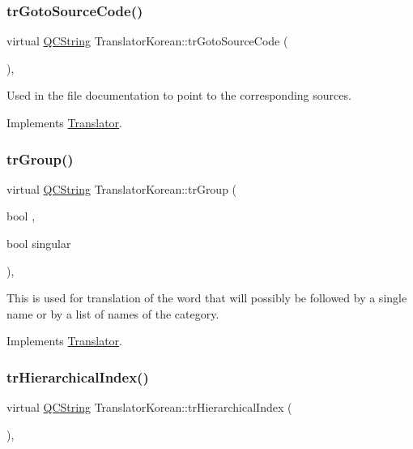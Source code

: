\subsubsection{\texorpdfstring{trGotoSourceCode()}{trGotoSourceCode()}}
{\footnotesize\ttfamily virtual \mbox{\hyperlink{class_q_c_string}{Q\+C\+String}} Translator\+Korean\+::tr\+Goto\+Source\+Code (\begin{DoxyParamCaption}{ }\end{DoxyParamCaption})\hspace{0.3cm}{\ttfamily [inline]}, {\ttfamily [virtual]}}

Used in the file documentation to point to the corresponding sources. 

Implements \mbox{\hyperlink{class_translator}{Translator}}.

\mbox{\label{class_translator_korean_abb8abbd3d17b2c6b9052eb9dc1ba31f0}} 
\subsubsection{\texorpdfstring{trGroup()}{trGroup()}}
{\footnotesize\ttfamily virtual \mbox{\hyperlink{class_q_c_string}{Q\+C\+String}} Translator\+Korean\+::tr\+Group (\begin{DoxyParamCaption}\item[{bool}]{,  }\item[{bool}]{singular }\end{DoxyParamCaption})\hspace{0.3cm}{\ttfamily [inline]}, {\ttfamily [virtual]}}

This is used for translation of the word that will possibly be followed by a single name or by a list of names of the category. 

Implements \mbox{\hyperlink{class_translator}{Translator}}.

\mbox{\label{class_translator_korean_ae8c31d2a88a97f93c605f6c2d5eb040e}} 
\subsubsection{\texorpdfstring{trHierarchicalIndex()}{trHierarchicalIndex()}}
{\footnotesize\ttfamily virtual \mbox{\hyperlink{class_q_c_string}{Q\+C\+String}} Translator\+Korean\+::tr\+Hierarchical\+Index (\begin{DoxyParamCaption}{ }\end{DoxyParamCaption})\hspace{0.3cm}{\ttfamily [inline]}, {\ttfamily [virtual]}}

